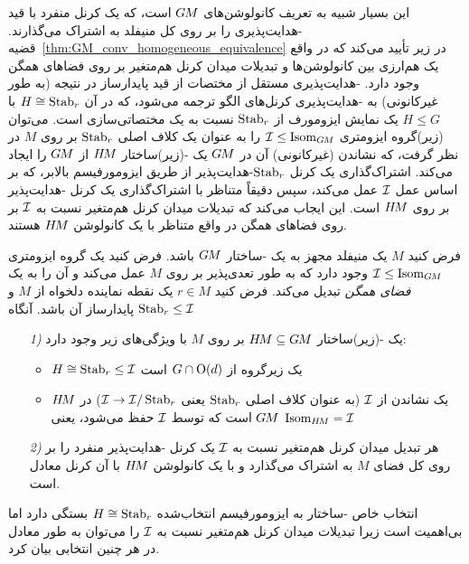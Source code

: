 این بسیار شبیه به تعریف کانولوشن‌های $G\mkern-1.4muM$ است، که یک کرنل منفرد با قید -هدایت‌پذیری را بر روی کل منیفلد به اشتراک می‌گذارند.
قضیه~\ref{thm:GM_conv_homogeneous_equivalence} در زیر تأیید می‌کند که در واقع یک هم‌ارزی بین کانولوشن‌ها و تبدیلات میدان کرنل هم‌متغیر بر روی فضاهای همگن وجود دارد.
-هدایت‌پذیری مستقل از مختصات از قید پایدارساز در نتیجه (به طور غیرکانونی) به -هدایت‌پذیری کرنل‌های الگو ترجمه می‌شود، که در آن $H \cong \operatorname{Stab}_{r}$ با $H\leq G$ یک نمایش ایزومورف از $\operatorname{Stab}_{r}$ نسبت به یک مختصاتی‌سازی است.
می‌توان (زیر)گروه ایزومتری $\mathcal{I} \leq \operatorname{Isom}_{G\mkern-1.4muM}$ را به عنوان یک کلاف اصلی $\operatorname{Stab}_{r}$ بر روی $M$ در نظر گرفت، که نشاندن (غیرکانونی) آن در $G\mkern-1.4muM$ یک -(زیر)ساختار $H\mkern-2.5muM$ از $G\mkern-1.4muM$ را ایجاد می‌کند.
اشتراک‌گذاری یک کرنل $\operatorname{Stab}_{r}$-هدایت‌پذیر از طریق ایزومورفیسم بالابر، که بر اساس عمل $\mathcal{I}$ عمل می‌کند،
سپس دقیقاً متناظر با اشتراک‌گذاری یک کرنل -هدایت‌پذیر بر روی $H\mkern-2.5muM$ است.
این ایجاب می‌کند که تبدیلات میدان کرنل هم‌متغیر نسبت به $\mathcal{I}$ بر روی فضاهای همگن در واقع متناظر با یک کانولوشن $H\mkern-2.5muM$ هستند.
\begin{thm}
\label{thm:GM_conv_homogeneous_equivalence}
    فرض کنید $M$ یک منیفلد مجهز به یک -ساختار $G\mkern-1.4muM$ باشد.
    فرض کنید یک گروه ایزومتری $\mathcal{I} \leq \operatorname{Isom}_{G\mkern-1.4muM}$ وجود دارد که به طور تعدی‌پذیر بر روی $M$ عمل می‌کند و آن را به یک \emph{فضای همگن} تبدیل می‌کند.
    فرض کنید $r\in M$ یک نقطه نماینده دلخواه از $M$ و $\operatorname{Stab}_{r} \leq \mathcal{I}$ پایدارساز آن باشد.
    آنگاه
    \begin{itemize}
        \item[\textit{1)}] یک -(زیر)ساختار $H\mkern-2.5muM \subseteq G\mkern-1.4muM$ بر روی $M$ با ویژگی‌های زیر وجود دارد:
            \begin{itemize}\setlength\itemsep{1ex}
                \item $H \cong \operatorname{Stab}_{r} \leq \mathcal{I}$ یک زیرگروه از $G \cap \operatorname{O}(d)$ است
                \item $H\mkern-2.5muM$ یک نشاندن از $\mathcal{I}$ (به عنوان کلاف اصلی $\operatorname{Stab}_{r}$ یعنی $\mathcal{I} \to \mathcal{I}/\operatorname{Stab}_{r}$) در $G\mkern-1.4muM$ است که توسط $\mathcal{I}$ حفظ می‌شود، یعنی $\operatorname{Isom}_{H\mkern-2.5muM} = \mathcal{I}$
            \end{itemize}
        \item[\textit{2)}] هر تبدیل میدان کرنل هم‌متغیر نسبت به $\mathcal{I}$ یک کرنل
         -هدایت‌پذیر منفرد را بر روی کل فضای $M$ به اشتراک می‌گذارد و با یک کانولوشن $H\mkern-2.5muM$ با آن کرنل معادل است.
    \end{itemize}
    انتخاب خاص -ساختار به ایزومورفیسم انتخاب‌شده $H \cong \operatorname{Stab}_{r}$ بستگی دارد اما بی‌اهمیت است زیرا تبدیلات میدان کرنل هم‌متغیر نسبت به $\mathcal{I}$ را می‌توان به طور معادل در هر چنین انتخابی بیان کرد.
\end{thm}
